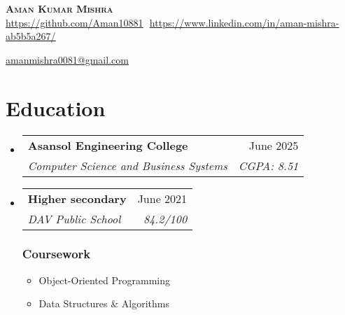 \documentclass[letterpaper,11pt]{article}
\makeatletter
\newcommand{\resumeItem}[1]{
  \item\small{
    {#1 \vspace{-2pt}}
  }
}
\newcommand{\resumeSubheading}[4]{
  \vspace{-2pt}\item
    \begin{tabular*}{0.97\textwidth}[t]{l@{\extracolsep{\fill}}r}
      \textbf{#1} & #2 \\
      \textit{\small#3} & \textit{\small #4} \\
    \end{tabular*}\vspace{-7pt}
}
\newcommand{\resumeSubHeadingListStart}{\begin{itemize}[leftmargin=0.15in, label={}]}
\newcommand{\resumeSubHeadingListEnd}{\end{itemize}}
\newcommand{\resumeItemListStart}{\begin{itemize}}
\newcommand{\resumeItemListEnd}{\end{itemize}\vspace{-5pt}}
\makeatother
\begin{document}
\begin{flushright}
  \color{gray}
  \item
  
\end{flushright}

\vspace{-5pt}

\begin{center}
    \textbf{\Huge \scshape Aman Kumar Mishra} \\ \vspace{8pt}
    \small 
    \href{https://github.com/Aman10881}{\underline{https://github.com/Aman10881}} $  $
    \href{https://www.linkedin.com/in/aman-mishra-ab5b5a267/}{\underline{https://www.linkedin.com/in/aman-mishra-ab5b5a267/}} $  $
    
    \href{mailto:amanmishra0081@gmail.com}
    {\underline{amanmishra0081@gmail.com}}
\end{center}

\section{Education}
  \resumeSubHeadingListStart
  
    \resumeSubheading
      {Asansol Engineering College}{June 2025}
      {Computer Science and Business Systems }{CGPA: 8.51}
      
    \resumeSubheading
      {Higher secondary } {June 2021} 
      {DAV Public School }   {84.2/100}

    \subsubsection*{Coursework}
    \vspace{-1em} %
    \resumeItemListStart
      \setlength\itemsep{0.5em} %
      \resumeItem{Object-Oriented Programming}
      \resumeItem{Data Structures \& Algorithms}
    \resumeItemListEnd
    
  \resumeSubHeadingListEnd


\end{document}
